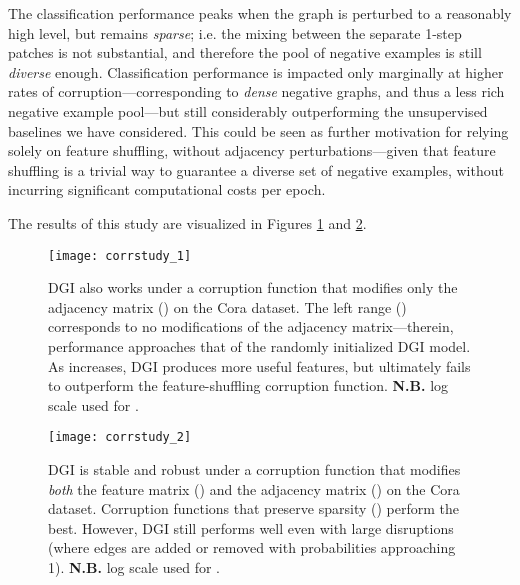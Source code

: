 \documentclass{article} \usepackage{iclr2019_conference,times}
\begin{document}
The classification performance peaks when the graph is perturbed to a reasonably high level, but remains \emph{sparse}; i.e. the mixing between the separate 1-step patches is not substantial, and therefore the pool of negative examples is still \emph{diverse} enough. Classification performance is impacted only marginally at higher rates of corruption---corresponding to \emph{dense} negative graphs, and thus a less rich negative example pool---but still considerably outperforming the unsupervised baselines we have considered. This could be seen as further motivation for relying solely on feature shuffling, without adjacency perturbations---given that feature shuffling is a trivial way to guarantee a diverse set of negative examples, without incurring significant computational costs per epoch.

The results of this study are visualized in Figures \ref{fig:adj_only_corruption} and \ref{fig:adj_corruption}.

\begin{figure}
    \centering
    \texttt{[image: corrstudy\_1]}
    \caption{DGI also works under a corruption function that modifies only the adjacency matrix () on the Cora dataset.  The left range () corresponds to no modifications of the adjacency matrix---therein, performance approaches that of the randomly initialized DGI model. As  increases, DGI produces more useful features, but ultimately fails to outperform the feature-shuffling corruption function. {\bf N.B.} log scale used for .}
    \label{fig:adj_only_corruption}
\end{figure}

\begin{figure}
    \centering
    \texttt{[image: corrstudy\_2]}
    \caption{DGI is stable and robust under a corruption function that modifies \textit{both} the feature matrix () and the adjacency matrix () on the Cora dataset. Corruption functions that preserve sparsity () perform the best. However, DGI still performs well even with large disruptions (where edges are added or removed with probabilities approaching 1). {\bf N.B.} log scale used for .}
    \label{fig:adj_corruption}
\end{figure}

 
\end{document}

